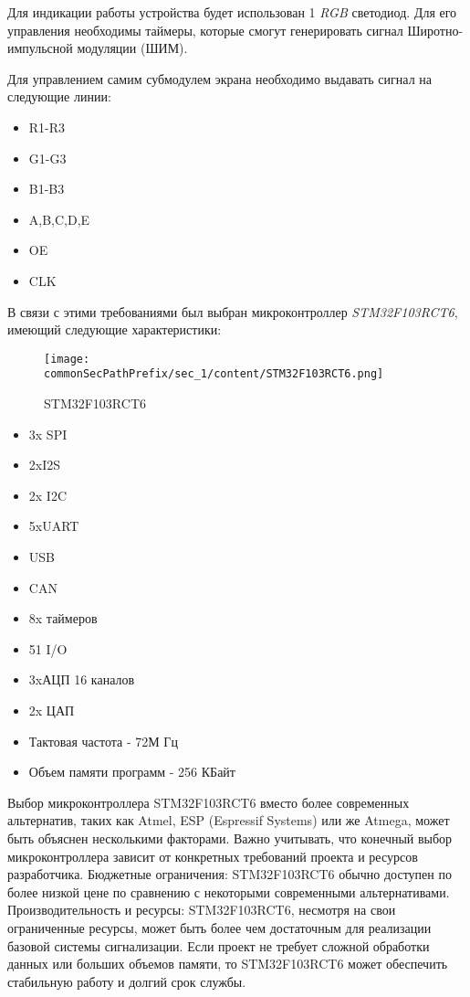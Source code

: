 Для индикации работы устройства будет использован 1 \textit{RGB} светодиод. Для его управления необходимы таймеры, которые смогут генерировать сигнал Широтно-импульсной модуляции (ШИМ).

Для управлением самим субмодулем экрана необходимо выдавать сигнал на следующие линии:
\begin{itemize}
    \item R1-R3
    \item G1-G3
    \item B1-B3
    \item A,B,C,D,E
    \item OE
    \item CLK
\end{itemize}

В связи с этими требованиями был выбран микроконтроллер \textit{STM32F103RCT6}, имеющий следующие характеристики:
\begin{figure}[ht]
    \centering
    \texttt{[image: \\commonSecPathPrefix/sec\_1/content/STM32F103RCT6.png]}
    \caption{STM32F103RCT6}
    \label{fig:STM32F103RCT6}
\end{figure}

\begin{itemize}
    \item 3x SPI
    \item 2xI2S
    \item 2x I2C
    \item 5xUART
    \item USB
    \item CAN
    \item 8x таймеров
    \item 51 I/O
    \item 3xАЦП 16 каналов
    \item 2x ЦАП
    \item Тактовая частота - 72М Гц
    \item Объем памяти программ -  	256 КБайт
\end{itemize}

Выбор микроконтроллера STM32F103RCT6 вместо более современных альтернатив, таких как Atmel, ESP (Espressif Systems) или же Atmega, может быть объяснен несколькими факторами. Важно учитывать, что конечный выбор микроконтроллера зависит от конкретных требований проекта и ресурсов разработчика. Бюджетные ограничения: STM32F103RCT6 обычно доступен по более низкой цене по сравнению с некоторыми современными альтернативами. Производительность и ресурсы: STM32F103RCT6, несмотря на свои ограниченные ресурсы, может быть более чем достаточным для реализации базовой системы сигнализации. Если проект не требует сложной обработки данных или больших объемов памяти, то STM32F103RCT6 может обеспечить стабильную работу и долгий срок службы. 